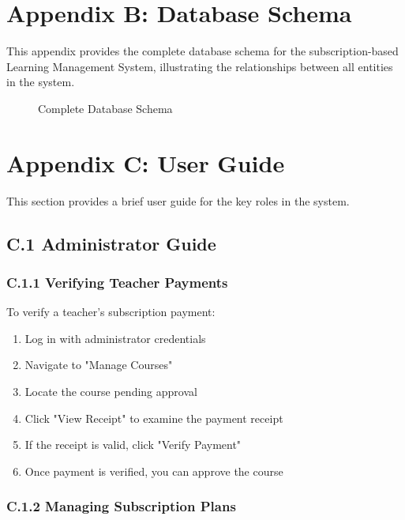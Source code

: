 \section*{Appendix B: Database Schema}

This appendix provides the complete database schema for the subscription-based Learning Management System, illustrating the relationships between all entities in the system.

\begin{figure}[h]
\centering
\caption{Complete Database Schema}
\label{fig:database-schema}
\end{figure}

\section*{Appendix C: User Guide}

This section provides a brief user guide for the key roles in the system.

\subsection*{C.1 Administrator Guide}

\subsubsection*{C.1.1 Verifying Teacher Payments}

To verify a teacher's subscription payment:

\begin{enumerate}
    \item Log in with administrator credentials
    \item Navigate to "Manage Courses"
    \item Locate the course pending approval
    \item Click "View Receipt" to examine the payment receipt
    \item If the receipt is valid, click "Verify Payment"
    \item Once payment is verified, you can approve the course
\end{enumerate}

\subsubsection*{C.1.2 Managing Subscription Plans}

